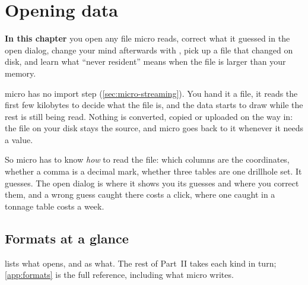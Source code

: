 \chapter{Opening data}\label{ch:opening}
\begin{goals}
\textbf{In this chapter} you open any file micro reads, correct what it guessed in the open dialog, change your mind afterwards with , pick up a file that changed on disk, and learn what ``never resident'' means when the file is larger than your memory.
\end{goals}

micro has no import step (\cref{sec:micro-streaming}). You hand it a file, it reads the first few kilobytes to decide what the file is, and the data starts to draw while the rest is still being read. Nothing is converted, copied or uploaded on the way in: the file on your disk stays the source, and micro goes back to it whenever it needs a value.

So micro has to know \emph{how} to read the file: which columns are the coordinates, whether a comma is a decimal mark, whether three tables are one drillhole set. It guesses. The open dialog is where it shows you its guesses and where you correct them, and a wrong guess caught there costs a click, where one caught in a tonnage table costs a week.

\section{Formats at a glance}\label{sec:opening-formats}

 lists what opens, and as what. The rest of Part~II takes each kind in turn; \cref{app:formats} is the full reference, including what micro writes.


